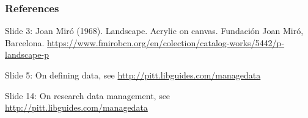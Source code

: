 \documentclass{beamer}
\begin{document}
\begin{frame}
  \frametitle{References}
  \tiny
  
  \vspace{0.5cm}
  Slide 3: Joan Mir{\'o} (1968). Landscape. Acrylic on canvas. Fundaci{\'o}n Joan Mir{\'o}, Barcelona. \url{https://www.fmirobcn.org/en/colection/catalog-works/5442/p-landscape-p}
  
  Slide 5: On defining data, see \url{http://pitt.libguides.com/managedata}
  
  Slide 14: On research data management, see \url{http://pitt.libguides.com/managedata}
\end{frame}
\end{document}
